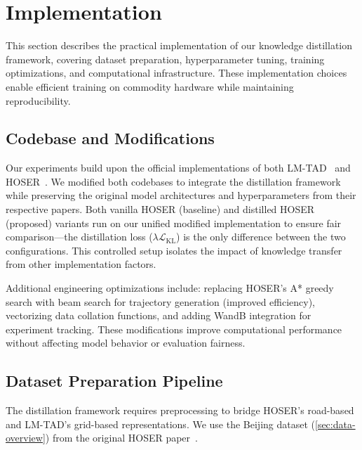 
\section{Implementation}
\label{sec:implementation}

This section describes the practical implementation of our knowledge distillation framework, covering dataset preparation, hyperparameter tuning, training optimizations, and computational infrastructure. These implementation choices enable efficient training on commodity hardware while maintaining reproducibility.

\subsection{Codebase and Modifications}
\label{sec:impl-codebase}

Our experiments build upon the official implementations of both LM-TAD~\cite{mbuyaTrajectoryAnomalyDetection2024,JonathankabalaLMTAD} and HOSER~\cite{caoHolisticSemanticRepresentation2025,HOSEREvaluationMainipynb}. We modified both codebases to integrate the distillation framework while preserving the original model architectures and hyperparameters from their respective papers. Both vanilla HOSER (baseline) and distilled HOSER (proposed) variants run on our unified modified implementation to ensure fair comparison---the distillation loss ($\lambda \mathcal{L}_{\text{KL}}$) is the only difference between the two configurations. This controlled setup isolates the impact of knowledge transfer from other implementation factors.

Additional engineering optimizations include: replacing HOSER's A* greedy search with beam search for trajectory generation (improved efficiency), vectorizing data collation functions, and adding WandB integration for experiment tracking. These modifications improve computational performance without affecting model behavior or evaluation fairness.

\subsection{Dataset Preparation Pipeline}
\label{sec:impl-dataset-prep}

The distillation framework requires preprocessing to bridge HOSER's road-based and LM-TAD's grid-based representations. We use the Beijing dataset (\autoref{sec:data-overview}) from the original HOSER paper~\cite{caoHolisticSemanticRepresentation2025}.

